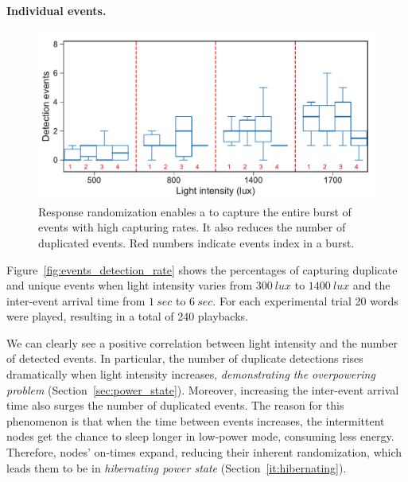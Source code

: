 \paragraph{Individual events.}
\begin{figure}[t]
	\centering
     \includegraphics[width=\columnwidth]{figures/events_burst_rand}
    \caption{Response randomization enables a \cis to capture the entire burst of events with high capturing rates. It also reduces the number of duplicated events. Red numbers indicate events index in a burst.}
    \label{fig:events_burst_rand}
\end{figure}

Figure~\ref{fig:events_detection_rate} shows the percentages of capturing duplicate and unique events when light intensity varies from $\SI{300}{lux}$ to $\SI{1400}{lux}$ and the inter-event arrival time from $\SI{1}{sec}$ to $\SI{6}{sec}$. For each experimental trial 20 words were played, resulting in a total of 240 playbacks. 

We can clearly see a positive correlation between light intensity and the number of detected events. In particular, the number of duplicate detections rises dramatically when light intensity increases, \emph{demonstrating the overpowering problem} (Section~\ref{sec:power_state}). Moreover, increasing the inter-event arrival time also surges the number of duplicated events. The reason for this phenomenon is that when the time between events increases, the intermittent nodes get the chance to sleep longer in low-power mode, consuming less energy. Therefore, nodes' on-times expand, reducing their inherent randomization, which leads them to be in \textit{hibernating power state} (Section~\ref{it:hibernating}).  


